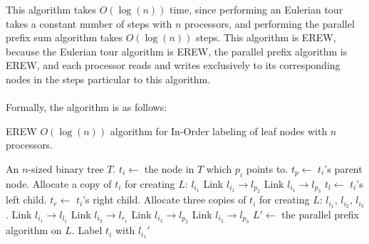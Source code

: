 \documentclass[letterpaper,notitlepage,twoside]{article}
\begin{document}
This algorithm takes $O(\log(n))$ time, since performing an Eulerian tour takes a constant number of steps with $n$ processors, and performing the parallel prefix sum algorithm takes $O(\log(n))$ steps. This algorithm is EREW, because the Eulerian tour algorithm is EREW, the parallel prefix algorithm is EREW, and each processor reads and writes exclusively to its corresponding nodes in the steps particular to this algorithm.
\\\\
Formally, the algorithm is as follows:
\begin{algorithm}[H]
  \begin{algorithmic}%
    \caption{EREW $O(\log(n))$ algorithm for In-Order labeling of leaf nodes with $n$ processors.}
    \Require An $n$-sized binary tree $T$.
	\State $t_i \gets $ the node in $T$ which $p_i$ points to.
	\State $t_p \gets $ $t_i$'s parent node.
		\State Allocate a copy of $t_i$ for creating $L$: $l_{i_1}$
			\State Link $l_{i_1} \rightarrow l_{p_2}$
			\State Link $l_{i_1} \rightarrow l_{p_3}$
		\EndIf
	\Else
		\State $t_l \gets $ $t_i$'s left child.
		\State $t_r \gets $ $t_i$'s right child.
		\State Allocate three copies of $t_i$ for creating $L$: $l_{i_1}$, $l_{i_2}$, $l_{i_3}$.
		\State Link $l_{i_1} \rightarrow l_{l_1}$
		\State Link $l_{i_2} \rightarrow l_{r_1}$
			\State Link $l_{i_3} \rightarrow l_{p_2}$
			\State Link $l_{i_3} \rightarrow l_{p_3}$
		\EndIf
	\EndIf
	\State $L' \gets$ the parallel prefix algorithm on $L$.
		\State Label $t_i$ with $l_{i_1}'$
	\EndIf
  \end{algorithmic}
\end{algorithm}
\end{document}
